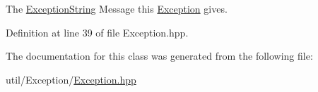 The \hyperlink{namespace_triton_1_1_util_a7e55ae91d6ccf98a52870cf7b7648eb7}{Exception\+String} Message this \hyperlink{class_triton_1_1_util_1_1_exception}{Exception} gives. 



Definition at line 39 of file Exception.\+hpp.



The documentation for this class was generated from the following file\+:\begin{DoxyCompactItemize}
\item 
util/\+Exception/\hyperlink{_exception_8hpp}{Exception.\+hpp}\end{DoxyCompactItemize}

